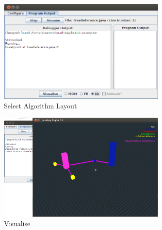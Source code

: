 \documentclass[11pt, a4paper]{report}
\begin{document}
\begin{appendices}
\begin{figure}[h]
        \centering
        \includegraphics[width=0.75\textwidth]{images/final/walk4.png}
        \caption{Select Algorithm Layout}
\end{figure}

\begin{figure}[h]
        \centering
        \includegraphics[width=0.75\textwidth]{images/final/walk5.png}
        \caption{Visualise}
\end{figure}

\end{appendices}
\end{document}
